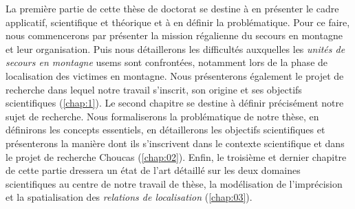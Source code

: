 La première partie de cette thèse de doctorat se destine à en
présenter le cadre applicatif, scientifique et théorique et à en
définir la problématique. Pour ce faire, nous commencerons par
présenter la mission régalienne du secours en montagne et leur
organisation. Puis nous détaillerons les difficultés auxquelles les
\emph{unités de secours en montagne} \acp{usem} sont confrontées,
notamment lors de la phase de localisation des victimes en
montagne. Nous présenterons également le projet de recherche dans
lequel notre travail s'inscrit, son origine et ses objectifs
scientifiques (\autoref{chap:1}). Le second chapitre se destine à
définir précisément notre sujet de recherche. Nous formaliserons la
problématique de notre thèse, en définirons les concepts essentiels,
en détaillerons les objectifs scientifiques et présenterons la manière
dont ils s'inscrivent dans le contexte scientifique et dans le projet
de recherche Choucas (\autoref{chap:02}). Enfin, le troisième et
dernier chapitre de cette partie dressera un état de l'art détaillé
sur les deux domaines scientifiques au centre de notre travail de
thèse, la modélisation de l'imprécision et la spatialisation des
\emph{relations de localisation} (\autoref{chap:03}).

